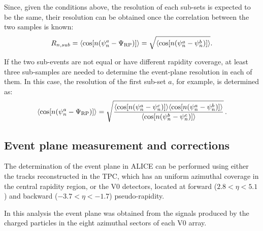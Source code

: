 Since, given the conditions above, the resolution of each sub-sets is expected 
to be the same, their resolution can be obtained 
once the correlation between the two samples is known:
\begin{equation}
R_{n, sub} = \langle {\rm cos} [n({\rm \psi}^a_n-{\rm \Psi}_{\rm RP})] \rangle = \sqrt{\langle {\rm cos} [n({\rm \psi}^a_n-{\rm \psi}^b_n)] \rangle}.
\end{equation}

If the two sub-events are not equal or have different rapidity coverage,
at least three sub-samples are needed to determine the 
event-plane resolution in each of them. In this case, 
the resolution of the first sub-set $a$, for example, is determined as:
\begin{equation}
 \langle {\rm cos} [n({\rm \psi}^a_n-{\rm \Psi}_{\rm RP})] \rangle = 
\sqrt{\frac{\langle\cos [n(\psi_n^a-\psi_n^c)] \rangle \langle\cos [n(\psi_n^a-\psi_n^b)] \rangle}{\langle\cos [n(\psi_n^b-\psi_n^c)] \rangle}}\, .
\end{equation}

\subsection{Event plane measurement and corrections}

The determination of the event plane in ALICE can be performed using
either the tracks reconstructed in the TPC, which has an uniform
azimuthal coverage in the central rapidity region, or the V0
detectors, located at forward ($2.8<\eta<5.1$) and backward
($-3.7<\eta<-1.7$) pseudo-rapidity.

In this analysis the event plane was obtained from the 
signals produced by the charged particles in the eight 
azimuthal sectors of each V0 array.

